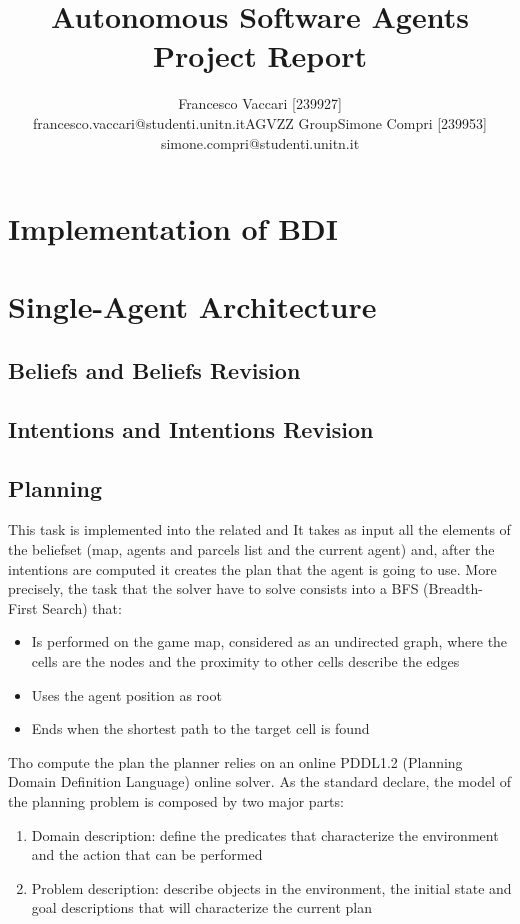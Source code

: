 \documentclass[a4paper, 11pt]{article}
\title{\Huge{Autonomous Software Agents} \\ \Large{Project Report} }
\author{
\begin{tabular}{ccc}
\parbox{7cm}{\centering Francesco Vaccari [239927] \\ \small{\centering francesco.vaccari@studenti.unitn.it}} & 
\parbox{1cm}{\centering \footnotesize{AGVZZ Group}} & 
\parbox{7cm}{\centering Simone Compri [239953] \\ \small{\centering simone.compri@studenti.unitn.it}}
\end{tabular}
}
\date{}
\begin{document}
\maketitle
\tableofcontents


\pagebreak

\section{Implementation of BDI}


\pagebreak



\section{Single-Agent Architecture}


\subsection{Beliefs and Beliefs Revision}


\subsection{Intentions and Intentions Revision}


\subsection{Planning}

This task is implemented into the related and It takes as input all the elements of the beliefset (map, agents and parcels list and the current agent) and, after the intentions are computed it creates the plan that the agent is going to use.
More precisely, the task that the solver have to solve consists into a BFS (Breadth-First Search) that:
\begin{itemize}
    \item Is performed on the game map, considered as an undirected graph, where the cells are the nodes and the proximity to other cells describe the edges
    \item Uses the agent position as root
    \item Ends when the shortest path to the target cell is found\\
\end{itemize}

Tho compute the plan the planner relies on an online PDDL1.2 (Planning Domain Definition Language) online solver. As the standard declare, the model of the planning problem is composed by two major parts:
\begin{enumerate}
    \item Domain description: define the predicates that characterize the environment and the action that can be performed
    \item Problem description: describe objects in the environment, the initial state and goal descriptions that will characterize the current plan\\
\end{enumerate}
\end{document}

